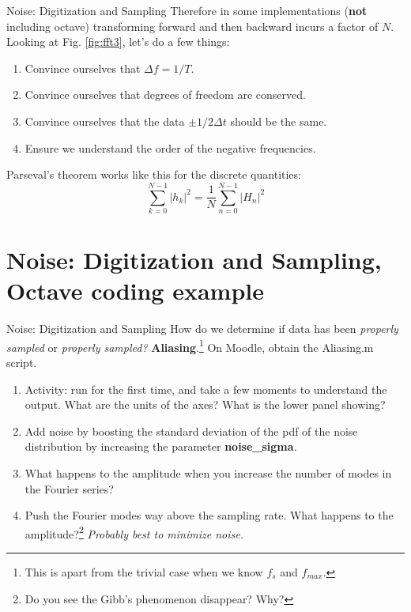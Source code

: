 \documentclass{beamer}
\begin{document}
\begin{frame}{Noise: Digitization and Sampling}
\small
Therefore in some implementations (\textbf{not} including octave) transforming forward and then backward incurs a factor of $N$. \\ \vspace{0.5cm}
Looking at Fig. \ref{fig:fft3}, let's do a few things:
\begin{enumerate}
\item Convince ourselves that $\Delta f = 1/T$.
\item Convince ourselves that degrees of freedom are conserved.
\item Convince ourselves that the data $\pm 1/2\Delta t$ should be the same.
\item Ensure we understand the order of the negative frequencies.
\end{enumerate}
Parseval's theorem works like this for the discrete quantities:
\begin{equation}
\sum_{k=0}^{N-1} |h_k|^2 = \frac{1}{N}\sum_{n=0}^{N-1} |H_n|^2
\end{equation}
\end{frame}

\section{Noise: Digitization and Sampling, Octave coding example}

\begin{frame}{Noise: Digitization and Sampling}
\small
How do we determine if data has been \textit{properly sampled} or \textit{properly sampled?} \textbf{Aliasing}.\footnote{This is apart from the trivial case when we know $f_s$ and $f_{max}$.} On Moodle, obtain the Aliasing.m script.
\begin{enumerate}
\item Activity: run for the first time, and take a few moments to understand the output. What are the units of the axes? What is the lower panel showing? 
\item Add noise by boosting the standard deviation of the pdf of the noise distribution by increasing the parameter \textbf{noise\_sigma}.
\item What happens to the amplitude when you increase the number of modes in the Fourier series?
\item Push the Fourier modes way above the sampling rate.  What happens to the amplitude?\footnote{Do you see the Gibb's phenomenon disappear?  Why?} \textit{Probably best to minimize noise.}
\end{enumerate}
\end{frame}
\end{document}
